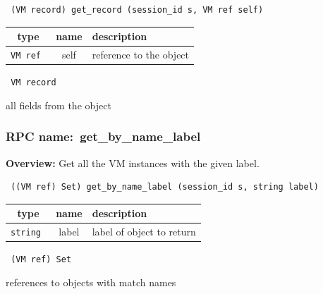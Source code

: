 \begin{verbatim} (VM record) get_record (session_id s, VM ref self)\end{verbatim}



 
\vspace{0.3cm}
\begin{tabular}{|c|c|p{7cm}|}
 \hline
{\bf type} & {\bf name} & {\bf description} \\ \hline
{\tt VM ref } & self & reference to the object \\ \hline 

\end{tabular}

\vspace{0.3cm}

{\tt 
VM record
}


all fields from the object
\vspace{0.3cm}
\vspace{0.3cm}
\vspace{0.3cm}
\subsubsection{RPC name:~get\_by\_name\_label}

{\bf Overview:} 
Get all the VM instances with the given label.

\begin{verbatim} ((VM ref) Set) get_by_name_label (session_id s, string label)\end{verbatim}



 
\vspace{0.3cm}
\begin{tabular}{|c|c|p{7cm}|}
 \hline
{\bf type} & {\bf name} & {\bf description} \\ \hline
{\tt string } & label & label of object to return \\ \hline 

\end{tabular}

\vspace{0.3cm}

{\tt 
(VM ref) Set
}


references to objects with match names
\vspace{0.3cm}
\vspace{0.3cm}
\vspace{0.3cm}

